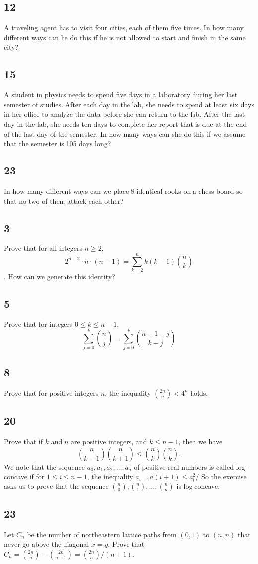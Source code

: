 \documentclass{amsart}
\begin{document}
\subsection*{12} A traveling agent has to visit four cities, each of them five times. In how many different ways can he do this if he is not allowed to start and finish in the same city?
\subsection*{15}A student in physics needs to spend five days in a laboratory during her last semester of studies. After each day in the lab, she needs to spend at least six days in her office to analyze the data before she can return to the lab. After the last day in the lab, she needs ten days to complete her report that is due at the end of the last day of the semester. In how many ways can she do this if we assume that the semester is 105 days long?
\subsection*{23}
In how many different ways can we place 8 identical rooks on a chess board so that no two of them attack each other?
\subsection*{3} Prove that for all integers $n \geq 2$, 
\[2^{n-2}\cdot n \cdot (n-1) = \sum_{k=2}^{n}k(k-1)\binom{n}{k}\].
How can we generate this identity?
\subsection*{5} Prove that for integers $0 \leq k \leq n-1,$
\[\sum_{j=0}^{k} \binom{n}{j} = \sum_{j=0}^{k} \binom{n-1-j}{k-j}\]
\subsection*{8} Prove that for positive integers $n$, the inequality $\binom{2n}{n} < 4^n$ holds.
\subsection*{20} Prove that if $k$ and $n$ are positive integers, and $k \leq n-1$, then we have 
\[\binom{n}{k-1} \binom{n}{k+1} \leq \binom{n}{k} \binom{n}{k}.\]
We note that the sequence $a_0,a_1,a_2,\ldots, a_n$ of positive real numbers is called log-concave if for $1 \leq i \leq n-1$, the inequality $a_{i-1}a(i+1) \leq a_i^2$/ So the exercise asks us to prove that the sequence $\binom{n}{0}, \binom{n}{1},\ldots, \binom{n}{n}$ is log-concave.
\subsection*{23} Let $C_n$ be the number of northeastern lattice paths from $(0,1)$ to $(n,n)$ that never go above the diagonal $x=y$. Prove that $C_n = \binom{2n}{n} - \binom{2n}{n-1} = \binom{2n}{n}/(n+1)$.
\end{document}
